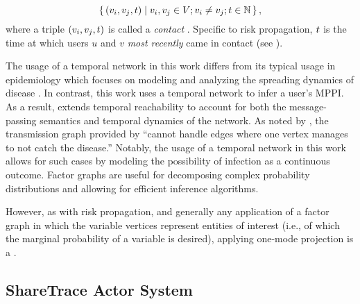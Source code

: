 \begin{equation}
    \setbuilder{(\vVariable[i], \vVariable[j], \vTime)}{\vVariable[i], \vVariable[j] \in \vVariables; \vVariable[i] \neq \vVariable[j]; \vTime \in \naturals}, \label{eq:contact-seq}
\end{equation}
%
where a triple $(\vVariable[i], \vVariable[j], \vTime)$ is called a \emph{contact} \cite{Holme2012}. Specific to risk propagation, $t$ is the time at which users $u$ and $v$ \emph{most recently} came in contact (see ).

The usage of a temporal network in this work differs from its typical usage in epidemiology which focuses on modeling and analyzing the spreading dynamics of disease \cite{Riolo2001, Danon2011, Lokhov2014, Craft2015, Pastor-Satorras2015, Koher2019, Zino2021}. In contrast, this work uses a temporal network to infer a user's MPPI. As a result,  extends temporal reachability to account for both the message-passing semantics and temporal dynamics of the network. As noted by \cite{Holme2012}, the transmission graph provided by \cite{Riolo2001} ``cannot handle edges where one vertex manages to not catch the disease.'' Notably, the usage of a temporal network in this work allows for such cases by modeling the possibility of infection as a continuous outcome.
Factor graphs are useful for decomposing complex probability distributions and allowing for efficient inference algorithms.

However, as with risk propagation, and generally any application of a factor graph in which the variable vertices represent entities of interest (i.e., of which the marginal probability of a variable is desired), applying one-mode projection is a .

\subsection{ShareTrace Actor System}

